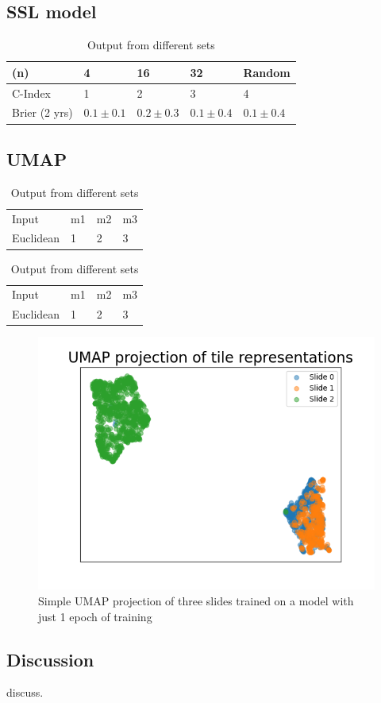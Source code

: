 \documentclass[10pt,twocolumn,letterpaper]{article}
\begin{document}
\subsection{SSL model}
\begin{table}
\centering
  \begin{tabular}{l l l l l}
    (n) & 4 & 16 & 32 & Random \\
    \hline
    C-Index & 1 & 2 & 3 & 4 \\
    Brier (2 yrs) & $0.1 \pm 0.1$ & $0.2 \pm 0.3$ & $0.1 \pm 0.4$ & $0.1 \pm 0.4$  \\
    \hline
  \end{tabular}
  \caption{Output from different sets}
  \label{tab:combinedres}
\end{table}


\subsection{UMAP}
\begin{table}
\centering
  \begin{tabular}{l l l l}
    Input & m1 & m2 & m3 \\
    Euclidean & 1 & 2 & 3 \\
  \end{tabular}
  \caption{Output from different sets}
  \label{tab:singleres}
\end{table}

\begin{table}
\centering
  \begin{tabular}{l l l l}
    Input & m1 & m2 & m3 \\
    Euclidean & 1 & 2 & 3 \\
  \end{tabular}
  \caption{Output from different sets}
  \label{tab:combinedres}
\end{table}

\begin{figure}
  \includegraphics[scale=.4]{./simple_umap_obvious.png}
  \caption{Simple UMAP projection of three slides trained on a model with just 1 epoch of training}
\label{fig:arbitrary}
\end{figure}



\subsection{Discussion}\label{sec:discussion}
discuss.

{\small


}
\end{document}
